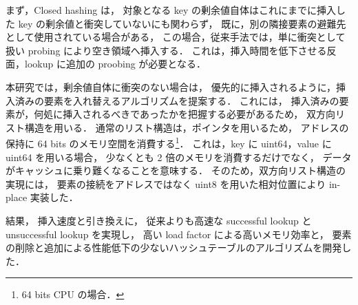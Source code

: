 まず，Closed hashing は，
対象となる key の剰余値自体はこれにまでに挿入した key の剰余値と衝突していないにも関わらず，
既に，別の隣接要素の避難先として使用されている場合がある，
この場合，従来手法では，単に衝突として扱い probing により空き領域へ挿入する．
これは，挿入時間を低下させる反面，lookup に追加の proobing が必要となる．

本研究では，剰余値自体に衝突のない場合は，
優先的に挿入されるように，挿入済みの要素を入れ替えるアルゴリズムを提案する．
これには，
挿入済みの要素が，何処に挿入されるべきであったかを把握する必要があるため，
双方向リスト構造を用いる．
通常のリスト構造は，ポインタを用いるため，
アドレスの保持に 64 bits のメモリ空間を消費する\footnote{64 bits CPU の場合．}．
これは，key に uint64，value に uint64 を用いる場合，
少なくとも 2 倍のメモリを消費するだけでなく，
データがキャッシュに乗り難くなることを意味する．
そのため，双方向リスト構造の実現には，
要素の接続をアドレスではなく uint8 を用いた相対位置により in-place 実装した．

結果，
挿入速度と引き換えに，
従来よりも高速な successful lookup と unsuccessful lookup を実現し，
高い load factor による高いメモリ効率と，
要素の削除と追加による性能低下の少ないハッシュテーブルのアルゴリズムを開発した．






